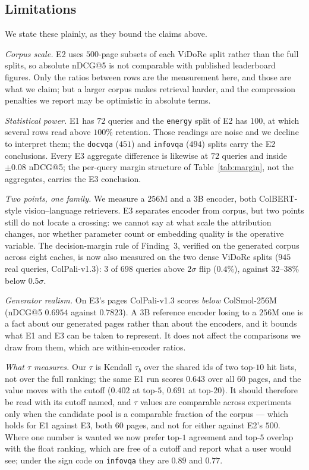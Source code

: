 \documentclass[conference]{IEEEtran}
\begin{document}
\subsection{Limitations}
\label{sec:limits}
We state these plainly, as they bound the claims above.

\emph{Corpus scale.} E2 uses $500$-page subsets of each ViDoRe split rather than
the full splits, so absolute nDCG@5 is not comparable with published leaderboard
figures. Only the ratios between rows are the measurement here, and those are what
we claim; but a larger corpus makes retrieval harder, and the compression
penalties we report may be optimistic in absolute terms.

\emph{Statistical power.} E1 has $72$ queries and the \texttt{energy} split of E2
has $100$, at which several rows read above $100\%$ retention. Those readings are
noise and we decline to interpret them; the \texttt{docvqa} ($451$) and
\texttt{infovqa} ($494$) splits carry the E2 conclusions. Every E3 aggregate
difference is likewise at $72$ queries and inside $\pm 0.08$ nDCG@5; the
per-query margin structure of Table~\ref{tab:margin}, not the aggregates,
carries the E3 conclusion.

\emph{Two points, one family.} We measure a $256$M and a $3$B encoder, both
ColBERT-style vision--language retrievers. E3 separates encoder from corpus, but two
points still do not locate a crossing: we cannot say at what scale the
attribution changes, nor whether parameter count or embedding quality is the
operative variable. The decision-margin rule of Finding~3, verified on the
generated corpus across eight caches, is now also measured on the two dense
ViDoRe splits ($945$ real queries, ColPali-v1.3): $3$ of $698$ queries above
$2\sigma$ flip ($0.4\%$), against $32$--$38\%$ below $0.5\sigma$.

\emph{Generator realism.} On E3's pages ColPali-v1.3 scores \emph{below}
ColSmol-256M (nDCG@5 $0.6954$ against $0.7823$). A $3$B reference encoder losing
to a $256$M one is a fact about our generated pages rather than about the
encoders, and it bounds what E1 and E3 can be taken to represent. It does not
affect the comparisons we draw from them, which are within-encoder ratios.

\emph{What $\tau$ measures.} Our $\tau$ is Kendall $\tau_b$ over the shared ids
of two top-$10$ hit lists, not over the full ranking; the same E1 run scores
$0.643$ over all $60$ pages, and the value moves with the cutoff ($0.402$ at
top-$5$, $0.691$ at top-$20$). It should therefore be read with its cutoff
named, and $\tau$ values are comparable across experiments only when the
candidate pool is a comparable fraction of the corpus --- which holds for E1
against E3, both $60$ pages, and not for either against E2's $500$. Where one
number is wanted we now prefer top-$1$ agreement and top-$5$ overlap with the
float ranking, which are free of a cutoff and report what a user would see;
under the sign code on \texttt{infovqa} they are $0.89$ and $0.77$.
\end{document}
